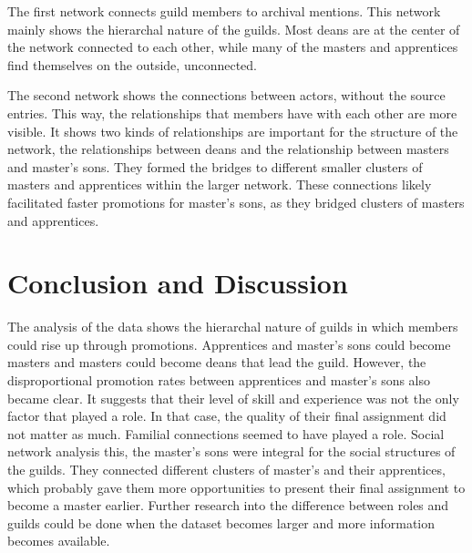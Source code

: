\documentclass[12pt]{article}
\begin{document}
The first network connects guild members to archival mentions.  
This network mainly shows the hierarchal nature of the guilds. Most deans are at the center of the network connected to each other, while many of the masters and apprentices find themselves on the outside, unconnected. 

The second network shows the connections between actors, without the source entries. This way, the relationships that members have with each other are more visible. It shows two kinds of relationships are important for the structure of the network, the relationships between deans and the relationship between masters and master's sons. They formed the bridges to different smaller clusters of masters and apprentices within the larger network. These connections likely facilitated faster promotions for master's sons, as they bridged clusters of masters and apprentices.



\section{Conclusion and Discussion}
\label{Conlusion}
The analysis of the data shows the hierarchal nature of guilds in which members could rise up through promotions. Apprentices and master's sons could become masters and masters could become deans that lead the guild. However, the disproportional promotion rates between apprentices and master's sons also became clear. It suggests that their level of skill and experience was not the only factor that played a role. In that case, the quality of their final assignment did not matter as much. Familial connections seemed to have played a role. Social network analysis this, the master's sons were integral for the social structures of the guilds. They connected different clusters of master's and their apprentices, which probably gave them more opportunities to present their final assignment to become a master earlier. Further research into the difference between roles and guilds could be done when the dataset becomes larger and more information becomes available. 
\end{document}
